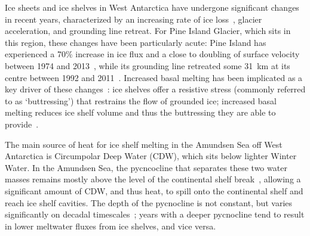 \documentclass[draft]{agujournal2019}
\begin{document}
Ice sheets and ice shelves in West Antarctica have undergone significant changes in recent years, characterized by an increasing rate of ice loss~\cite{Paolo2015Science}, glacier acceleration, and grounding line retreat. For Pine Island Glacier, which sits in this region, these changes have been particularly acute: Pine Island has experienced a 70\% increase in ice flux and a close to doubling of surface velocity between 1974 and 2013~\cite{Mouginot2014GRL}, while its grounding line retreated some 31~km at its centre between 1992 and 2011~\cite{Rignot2014GRL}. Increased basal melting has been implicated as a key driver of these changes~\cite{Pritchard2012Nature, Rignot2019PNAS}: ice shelves offer a resistive stress (commonly referred to as `buttressing') that restrains the flow of grounded ice; increased basal melting reduces ice shelf volume and thus the buttressing they are able to provide~\cite{Gudmundsson2013Cryo, Reese2018NatureClimCh, Gudmundsson2019GRL,Gagliardini2010GRL,Goldberg2019GRL}.

The main source of heat for ice shelf melting in the Amundsen Sea off West Antarctica is Circumpolar Deep Water (CDW), which sits below lighter Winter Water. In the Amundsen Sea, the pycncocline that separates these two water masses remains mostly above the level of the continental shelf break~\cite{Heywood2016Oceanography}, allowing a significant amount of CDW, and thus heat, to spill onto the continental shelf and reach ice shelf cavities. The depth of the pycnocline is not constant, but varies significantly on decadal timescales~\cite{Jenkins2018NatureGeo}; years with a deeper pycnocline tend to result in lower meltwater fluxes from ice shelves, and vice versa.
\end{document}
